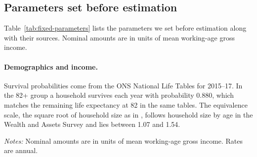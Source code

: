 \subsection{Parameters set before estimation}\label{sec:fixed-parameters}

Table~\ref{tab:fixed-parameters} lists the parameters we set before
estimation along with their sources. Nominal amounts are in units of mean
working-age gross income.

\paragraph{Demographics and income.}
Survival probabilities come from the ONS National Life Tables for 2015--17.
In the 82+ group a household survives each year with probability 0.880,
which matches the remaining life expectancy at 82 in the same tables. The equivalence scale, the square root of household size as in \citet{kinnerud2025effects}, follows household size by
age in the Wealth and Assets Survey and lies between 1.07 and 1.54.




\begin{table}[p]
  \centering
  \caption{Parameters set before estimation}\label{tab:fixed-parameters}
  \begin{threeparttable}
    \footnotesize
    \begin{tablenotes}[flushleft]\footnotesize
      \item {\textit{Notes:} Nominal amounts are in units of mean
      working-age gross income. Rates are annual.}
    \end{tablenotes}
  \end{threeparttable}
\end{table}

